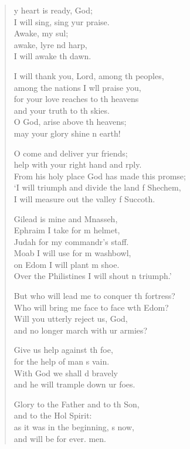 \begin{verse}
  \begin{patverse}
y heart is ready,  God;\Med\\
I will sing, sing yur praise.\\
Awake, my sul;\Flex\\
awake, lyre nd harp,\Med\\
I will awake th dawn.

I will thank you, Lord, among th peoples,\Med\\
among the nations I w\pointup{\i}ll praise you,\\
for your love reaches to th heavens\Med\\
and your truth to th skies.\\
O God, arise above th heavens;\Med\\
may your glory shine n earth!

O come and deliver yur friends;\Med\\
help with your right hand and rply.\\
From his holy place God has made this prom\pointup{\i}se;\Flex\\
‘I will triumph and divide the land f Shechem,\\
I will measure out the valley f Succoth.

Gilead is mine and Mnasseh,\Med\\
Ephraim I take for m helmet,\\
Judah for my commandr’s staff.\Med\\
Moab I will use for m washbowl,\\
on Edom I will plant m shoe.\Med\\
Over the Philistines I will shout \pointup{\i}n triumph.’

But who will lead me to conquer th fortress?\Med\\
Who will bring me face to face w\pointup{\i}th Edom?\\
Will you utterly reject us,  God,\Med\\
and no longer march with ur armies?

Give us help against th foe,\Med\\
for the help of man \pointup{\i}s vain.\\
With God we shall d bravely\Med\\
and he will trample down ur foes.

Glory to the Father and to th Son,\Med\\
and to the Hol Spirit:\\
as it was in the beginning, \pointup{\i}s now,\Med\\
and will be for ever. men.
  \end{patverse}
  \end{verse}
